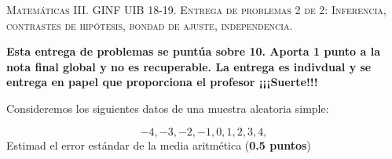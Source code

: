 \documentclass[10pt]{article}
\newcounter{problemes}
\newcounter{punts} \def\thepunts{\arabic{punts}}
\def\probl{\addtocounter{problemes}{1} \setcounter{punts}{0}
\medskip\noindent{\bf \theproblemes) }}
\begin{document}


 \vspace*{-2cm}


  


\begin{center}
\textsc{Matemáticas III. GINF UIB 18-19. Entrega  de problemas 2 de 2: Inferencia, contrastes de hipótesis, bondad de ajuste, independencia.}
\end{center}

\textbf{Esta entrega de problemas se puntúa sobre 10. Aporta 1 punto a la nota final global y no es recuperable. La entrega es indivdual y se entrega en papel que proporciona el profesor ¡¡¡Suerte!!!}

\setcounter{problemes}{0}

\probl Consideremos los siguientes datos de una muestra aleatoria simple:

$$-4,-3,-2,-1,0,1,2,3,4,$$
Estimad el error estándar de la media aritmética (\textbf{0.5 puntos})
\end{document}
